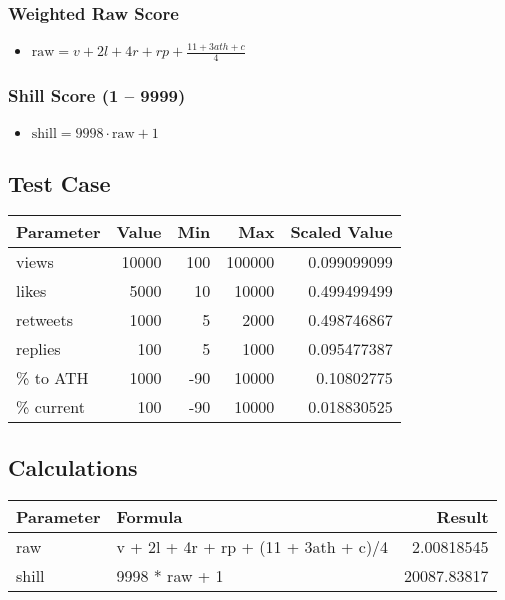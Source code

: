 \documentclass[11pt]{article}
\begin{document}
\subsubsection{Weighted Raw Score}
\label{sec:org563ff8c}
\begin{itemize}
\item \(\text{raw} = v + 2l + 4r + rp + \frac{11 + 3ath + c}{4}\)
\end{itemize}

\subsubsection{Shill Score (1 – 9999)}
\label{sec:org481f3e6}
\begin{itemize}
\item \(\text{shill} = 9998 \cdot \text{raw} + 1\)
\end{itemize}

\subsection{Test Case}
\label{sec:org7321ab1}
\begin{center}
\begin{tabular}{lrrrr}
Parameter & Value & Min & Max & Scaled Value\\[0pt]
\hline
views & 10000 & 100 & 100000 & 0.099099099\\[0pt]
likes & 5000 & 10 & 10000 & 0.499499499\\[0pt]
retweets & 1000 & 5 & 2000 & 0.498746867\\[0pt]
replies & 100 & 5 & 1000 & 0.095477387\\[0pt]
\% to ATH & 1000 & -90 & 10000 & 0.10802775\\[0pt]
\% current & 100 & -90 & 10000 & 0.018830525\\[0pt]
\end{tabular}
\end{center}

\subsection{Calculations}
\label{sec:org2bfd818}

\begin{center}
\begin{tabular}{llr}
Parameter & Formula & Result\\[0pt]
\hline
raw & v + 2l + 4r + rp + (11 + 3ath + c)/4 & 2.00818545\\[0pt]
shill & 9998 * raw + 1 & 20087.83817\\[0pt]
\end{tabular}
\end{center}
\end{document}

